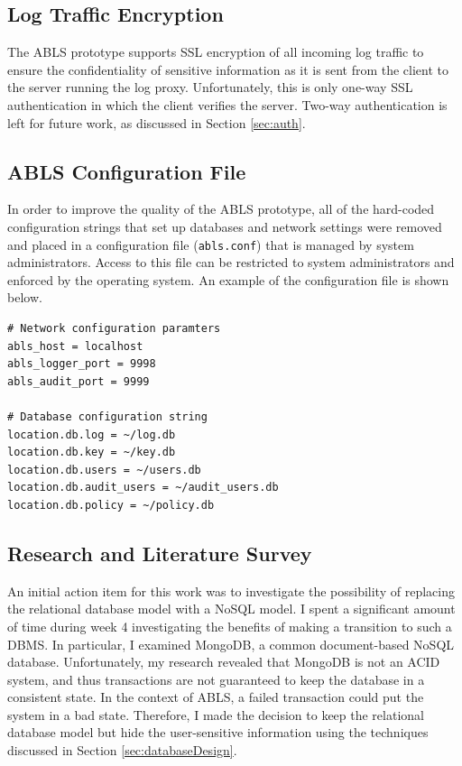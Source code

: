 \documentclass{sig-alternate}
\begin{document}
\subsection{Log Traffic Encryption}
The ABLS prototype supports SSL encryption of all incoming log traffic to ensure the confidentiality of sensitive
information as it is sent from the client to the server running the log proxy. Unfortunately, this is only one-way SSL 
authentication in which the client verifies the server. Two-way authentication is left for future work, as discussed in
Section \ref{sec:auth}.

\subsection{ABLS Configuration File} 
In order to improve the quality of the ABLS prototype, all of the hard-coded configuration strings that set up databases and 
network settings were removed and placed in a configuration file ({\tt abls.conf}) that is managed by system administrators.
Access to this file can be restricted to system administrators and enforced by the 
operating system. An example of the configuration file is shown below.

\begin{lstlisting}
# Network configuration paramters
abls_host = localhost
abls_logger_port = 9998
abls_audit_port = 9999

# Database configuration string
location.db.log = ~/log.db
location.db.key = ~/key.db
location.db.users = ~/users.db
location.db.audit_users = ~/audit_users.db
location.db.policy = ~/policy.db
\end{lstlisting}

\subsection{Research and Literature Survey}
An initial action item for this work was to investigate the possibility of replacing the relational database model with a 
NoSQL model. I spent a significant amount of time during week 4 investigating the benefits of making a transition
to such a DBMS. In particular, I examined MongoDB, a common document-based NoSQL database. Unfortunately,
my research revealed that MongoDB is not an ACID system, and thus transactions are not guaranteed to keep the
database in a consistent state. In the context of ABLS, a failed transaction could put the system in a bad state. Therefore,
I made the decision to keep the relational database model but hide the user-sensitive information using the techniques
discussed in Section \ref{sec:databaseDesign}.
\end{document}
